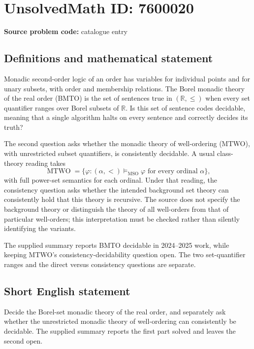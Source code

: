 \documentclass[11pt]{article}
\begin{document}
\section*{UnsolvedMath ID: 7600020}
\textbf{Source problem code:} catalogue entry
\subsection{Definitions and mathematical statement}
Monadic second-order logic of an order has variables for individual points and for unary subsets, with order and membership relations. The Borel monadic theory of the real order (BMTO) is the set of sentences true in $(\mathbb R,\leq)$ when every set quantifier ranges over Borel subsets of $\mathbb R$. Is this set of sentence codes decidable, meaning that a single algorithm halts on every sentence and correctly decides its truth?

The second question asks whether the monadic theory of well-ordering (MTWO), with unrestricted subset quantifiers, is consistently decidable. A usual class-theory reading takes
\[
\operatorname{MTWO}=\{\varphi:(\alpha,<)\models_{\mathrm{MSO}}\varphi\text{ for every ordinal }\alpha\},
\]
with full power-set semantics for each ordinal. Under that reading, the consistency question asks whether the intended background set theory can consistently hold that this theory is recursive. The source does not specify the background theory or distinguish the theory of all well-orders from that of particular well-orders; this interpretation must be checked rather than silently identifying the variants.

The supplied summary reports BMTO decidable in 2024--2025 work, while keeping MTWO's consistency-decidability question open. The two set-quantifier ranges and the direct versus consistency questions are separate.
\subsection{Short English statement}
Decide the Borel-set monadic theory of the real order, and separately ask whether the unrestricted monadic theory of well-ordering can consistently be decidable. The supplied summary reports the first part solved and leaves the second open.
\end{document}

